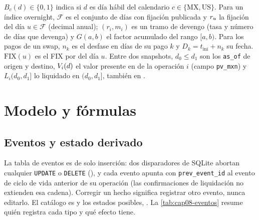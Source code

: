 $B_c(d) \in \{0, 1\}$ indica si $d$ es día hábil del calendario $c \in \{\mathrm{MX}, \mathrm{US}\}$. Para un índice overnight, $\mathcal{F}$ es el conjunto de días con fijación publicada y $r_{u}$ la fijación del día $u \in \mathcal{F}$ (decimal anual); $(r_i, m_i)$ es un tramo de devengo (tasa y número de días que devenga) y $G(a, b)$ el factor acumulado del rango $[a, b)$. Para los pagos de un swap, $n_k$ es el desfase en días de su pago $k$ y $D_k = t_{\mathrm{ini}} + n_k$ su fecha. $\mathrm{FIX}(u)$ es el FIX \MXN por \USD del día $u$. Entre dos snapshots, $d_0 \le d_1$ son los \texttt{as\_of} de origen y destino, $V_i(d)$ el valor presente en \MXN de la operación $i$ (campo \texttt{pv\_mxn}) y $L_i(d_0, d_1]$ lo liquidado en $(d_0, d_1]$, también en \MXN.

\section{Modelo y fórmulas}\label{sec:cap08-modelo}

\subsection{Eventos y estado derivado}\label{sec:cap08-estado}

La tabla de eventos es de solo inserción: dos disparadores de SQLite abortan cualquier \texttt{UPDATE} o \texttt{DELETE} (), y cada evento apunta con \texttt{prev\_event\_id} al evento de ciclo de vida anterior de su operación (las confirmaciones de liquidación no extienden esa cadena). Corregir un hecho significa registrar otro evento, nunca editarlo. El catálogo es  y los estados posibles, . La \cref{tab:cap08-eventos} resume quién registra cada tipo y qué efecto tiene.

